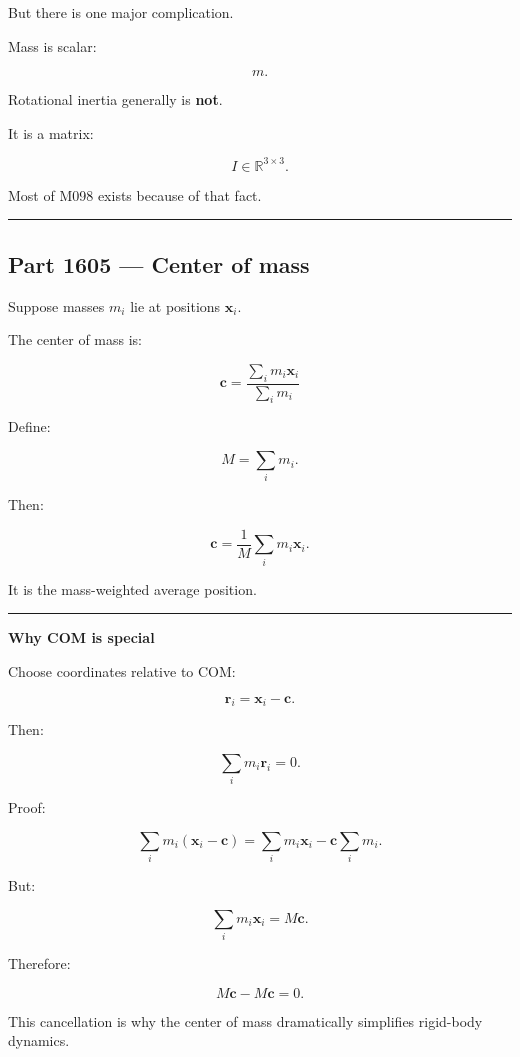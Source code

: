 But there is one major complication.

Mass is scalar:

\[
m.
\]

Rotational inertia generally is \textbf{not}.

It is a matrix:

\[
I\in\mathbb{R}^{3\times3}.
\]

Most of M098 exists because of that fact.

\begin{center}\rule{0.5\linewidth}{0.5pt}\end{center}

\subsection{Part 1605 --- Center of mass}\label{06-engine-ii-ch034-part-1605-center-of-mass}

Suppose masses \(m_i\) lie at positions \(\mathbf{x}_i\).

The center of mass is:

\[
\boxed{
\mathbf{c}
=
\frac{\sum_i m_i\mathbf{x}_i}
{\sum_i m_i}
}
\]

Define:

\[
M=\sum_i m_i.
\]

Then:

\[
\mathbf{c}
=
\frac{1}{M}
\sum_i
m_i\mathbf{x}_i.
\]

It is the mass-weighted average position.

\begin{center}\rule{0.5\linewidth}{0.5pt}\end{center}

\textbf{Why COM is special}

Choose coordinates relative to COM:

\[
\mathbf{r}_i
=
\mathbf{x}_i-\mathbf{c}.
\]

Then:

\[
\sum_i m_i\mathbf{r}_i
=
0.
\]

Proof:

\[
\sum_i m_i(\mathbf{x}_i-\mathbf{c})
=
\sum_i m_i\mathbf{x}_i
-
\mathbf{c}\sum_i m_i.
\]

But:

\[
\sum_i m_i\mathbf{x}_i
=
M\mathbf{c}.
\]

Therefore:

\[
M\mathbf{c}-M\mathbf{c}=0.
\]

This cancellation is why the center of mass dramatically simplifies rigid-body dynamics.

